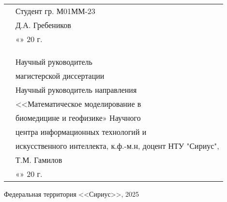 \vfill

\noindent
\begin{tabularx}{\textwidth}{@{}XX@{}}
  & \small Студент гр. М01ММ-23 \\ 
  & \small \underline{\hspace{3cm}} Д.А. Гребеников \\
  & \small «\underline{\hspace{1cm}}» \underline{\hspace{2cm}} 20\underline{\hspace{1cm}} г. \\
  & \\
  & \\
  \\
  & \small Научный руководитель \\
  & \small магистерской диссертации\\
  & \small Научный руководитель направления \\
  & \small <<Математическое моделирование в \\
  & \small биомедицине и геофизике» Научного  \\
  & \small центра информационных технологий и   \\
  & \small искусственного интеллекта, к.ф.-м.н, доцент НТУ "Сириус",  \\
  & \small \underline{\hspace{3cm}} Т.М. Гамилов \\
  & \small «\underline{\hspace{1cm}}» \underline{\hspace{2cm}} 20\underline{\hspace{1cm}} г. \\
\end{tabularx}

\vfill

\begin{center}
    \small Федеральная территория <<Сириус>>, 2025
\end{center}